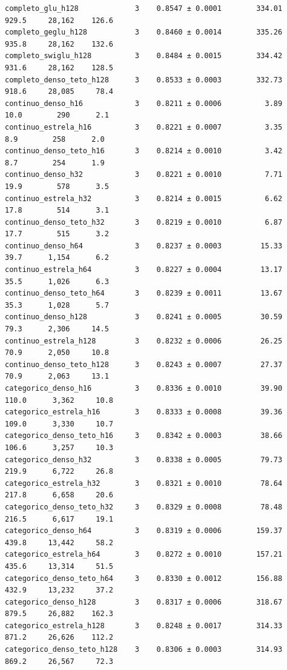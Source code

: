 \documentclass[10pt,a4paper]{article}
\begin{document}
{\begin{verbatim}
completo_glu_h128             3    0.8547 ± 0.0001        334.01         929.5     28,162    126.6
completo_geglu_h128           3    0.8460 ± 0.0014        335.26         935.8     28,162    132.6
completo_swiglu_h128          3    0.8484 ± 0.0015        334.42         931.6     28,162    128.5
completo_denso_teto_h128      3    0.8533 ± 0.0003        332.73         918.6     28,085     78.4
continuo_denso_h16            3    0.8211 ± 0.0006          3.89          10.0        290      2.1
continuo_estrela_h16          3    0.8221 ± 0.0007          3.35           8.9        258      2.0
continuo_denso_teto_h16       3    0.8214 ± 0.0010          3.42           8.7        254      1.9
continuo_denso_h32            3    0.8221 ± 0.0010          7.71          19.9        578      3.5
continuo_estrela_h32          3    0.8214 ± 0.0015          6.62          17.8        514      3.1
continuo_denso_teto_h32       3    0.8219 ± 0.0010          6.87          17.7        515      3.2
continuo_denso_h64            3    0.8237 ± 0.0003         15.33          39.7      1,154      6.2
continuo_estrela_h64          3    0.8227 ± 0.0004         13.17          35.5      1,026      6.3
continuo_denso_teto_h64       3    0.8239 ± 0.0011         13.67          35.3      1,028      5.7
continuo_denso_h128           3    0.8241 ± 0.0005         30.59          79.3      2,306     14.5
continuo_estrela_h128         3    0.8232 ± 0.0006         26.25          70.9      2,050     10.8
continuo_denso_teto_h128      3    0.8243 ± 0.0007         27.37          70.9      2,063     13.1
categorico_denso_h16          3    0.8336 ± 0.0010         39.90         110.0      3,362     10.8
categorico_estrela_h16        3    0.8333 ± 0.0008         39.36         109.0      3,330     10.7
categorico_denso_teto_h16     3    0.8342 ± 0.0003         38.66         106.6      3,257     10.3
categorico_denso_h32          3    0.8338 ± 0.0005         79.73         219.9      6,722     26.8
categorico_estrela_h32        3    0.8321 ± 0.0010         78.64         217.8      6,658     20.6
categorico_denso_teto_h32     3    0.8329 ± 0.0008         78.48         216.5      6,617     19.1
categorico_denso_h64          3    0.8319 ± 0.0006        159.37         439.8     13,442     58.2
categorico_estrela_h64        3    0.8272 ± 0.0010        157.21         435.6     13,314     51.5
categorico_denso_teto_h64     3    0.8330 ± 0.0012        156.88         432.9     13,232     37.2
categorico_denso_h128         3    0.8317 ± 0.0006        318.67         879.5     26,882    162.3
categorico_estrela_h128       3    0.8248 ± 0.0017        314.33         871.2     26,626    112.2
categorico_denso_teto_h128    3    0.8306 ± 0.0003        314.93         869.2     26,567     72.3
\end{verbatim}
}
\end{document}
